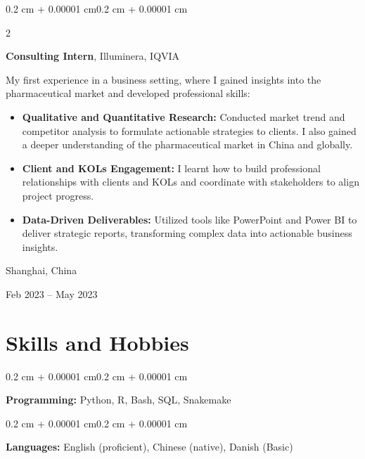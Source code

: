 \documentclass[10pt, letterpaper]{article}
\newenvironment{highlights}{
    \begin{itemize}[
        topsep=0.10 cm,
        parsep=0.10 cm,
        partopsep=0pt,
        itemsep=0pt,
        leftmargin=0.4 cm + 10pt
    ]
}{
    \end{itemize}
}
\newenvironment{onecolentry}{
    \begin{adjustwidth}{0.2 cm + 0.00001 cm}{0.2 cm + 0.00001 cm}
}{
    \end{adjustwidth}
}
\newenvironment{twocolentry}[2][]{
    \onecolentry
    \def\secondColumn{#2}
    \setcolumnwidth{\fill, 4.5 cm}
    \begin{paracol}{2}
}{
    \switchcolumn \raggedleft \secondColumn
    \end{paracol}
    \endonecolentry
}
\begin{document}
        \begin{twocolentry}{
    Shanghai, China

    Feb 2023 -- May 2023
}
    \textbf{Consulting Intern}, Illuminera, IQVIA

    \vspace{0.1cm}

    My first experience in a business setting, where I gained insights into the pharmaceutical market and developed professional skills:

    \begin{highlights}
        \item \textbf{Qualitative and Quantitative Research:} Conducted market trend and competitor analysis to formulate actionable strategies to clients. I also gained a deeper understanding of the pharmaceutical market in China and globally.

        \vspace{0.1cm}

        \item \textbf{Client and KOLs Engagement:} I learnt how to build professional relationships with clients and KOLs and coordinate with stakeholders to align project progress.

        \vspace{0.1cm}

        \item \textbf{Data-Driven Deliverables:} Utilized tools like PowerPoint and Power BI to deliver strategic reports, transforming complex data into actionable business insights.
    \end{highlights}
\end{twocolentry}

        \vspace{0.3 cm}


    \section{Skills and Hobbies}

        \begin{onecolentry}
            \textbf{Programming:} Python, R, Bash, SQL, Snakemake
        \end{onecolentry}

        \vspace{0.2 cm}

        \begin{onecolentry}
            \textbf{Languages:} English (proficient), Chinese (native), Danish (Basic)
        \end{onecolentry}
\end{document}
